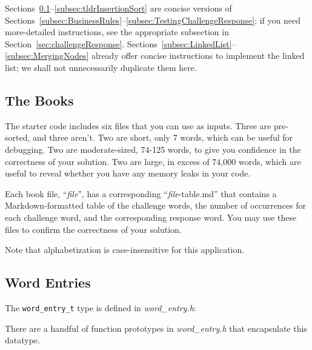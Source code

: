 Sections~\ref{subsec:tldrBusinessRules}--\ref{subsec:tldrInsertionSort} are concise versions of Sections~\ref{subsec:BusinessRules}--\ref{subsec:TestingChallengeResponse};
if you need more-detailed instructions, see the appropriate subsection in Section~\ref{sec:challengeResponse}.
Sections~\ref{subsec:LinkedList}--\ref{subsec:MergingNodes} already offer concise instructions to implement the linked list;
we shall not unnecessarily duplicate them here.

\subsection{The Books} \label{subsec:tldrBusinessRules}

    The starter code includes six files that you can use as inputs.
    Three are pre-sorted, and three aren't.
    Two are short, only 7 words, which can be useful for debugging.
    Two are moderate-sized, 74-125 words, to give you confidence in the correctness of your solution.
    Two are large, in excess of 74,000 words, which are useful to reveal whether you have any memory leaks in your code.

    Each book file, ``\textit{file}'', has a corresponding ``\textit{file}-table.md'' that contains a Markdown-formatted table of the challenge words, the number of occurrences for each challenge word, and the corresponding response word.
    You may use these files to confirm the correctness of your solution.


    Note that alphabetization is case-insensitive for this application.


\subsection{Word Entries}

    The \lstinline{word_entry_t} type is defined in \textit{word\_entry.h}:

    

    There are a handful of function prototypes in \textit{word\_entry.h} that encapsulate this datatype.

